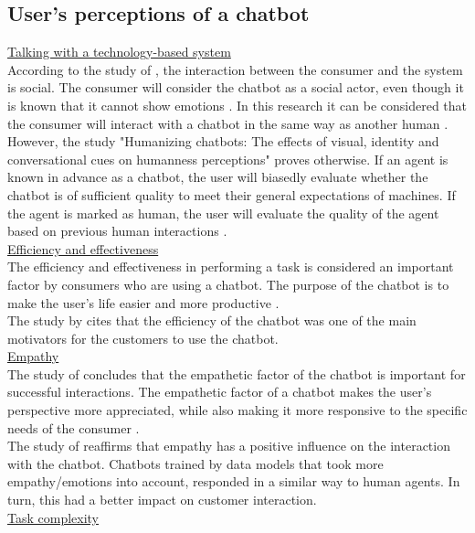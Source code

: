 \subsection{User’s perceptions of a chatbot}
\ul{Talking with a technology-based system}\\
According to the study of \citeauthor{Adam2021}, the interaction between the consumer and the system is social. The consumer will consider the chatbot as a social actor, even though it is known that it cannot show emotions \citep{Adam2021}. In this research it can be considered that the consumer will interact with a chatbot in the same way as another human \citep{Cheng2021,Ischen2020}.\\
However, the study "Humanizing chatbots: The effects of visual, identity and conversational cues on humanness perceptions" proves otherwise. If an agent is known in advance as a chatbot, the user will biasedly evaluate whether the chatbot is of sufficient quality to meet their general expectations of machines. If the agent is marked as human, the user will evaluate the quality of the agent based on previous human interactions \citep*{Go2019,Shyam2008}.\\
\break
\ul{Efficiency and effectiveness}\\
The efficiency and effectiveness in performing a task is considered an important factor by consumers who are using a chatbot. The purpose of the chatbot is to make the user's life easier and more productive \citep{Brandtzaeg2018}.\\
The study by \citeauthor{Skjuve2019} cites that the efficiency of the chatbot was one of the main motivators for the customers to use the chatbot.\citep{Skjuve2019}\\
\break
\ul{Empathy}\\
The study of \citeauthor{Cheng2021} concludes that the empathetic factor of the chatbot is important for successful interactions. The empathetic factor of a chatbot makes the user's perspective more appreciated, while also making it more responsive to the specific needs of the consumer \citep{Cheng2021}.\\
The study of \citeauthor{Agarwal2021} reaffirms that empathy has a positive influence on the interaction with the chatbot. Chatbots trained by data models that took more empathy/emotions into account, responded in a similar way to human agents. In turn, this had a better impact on customer interaction. \citep{Agarwal2021}\\
\break
\ul{Task complexity}\\
